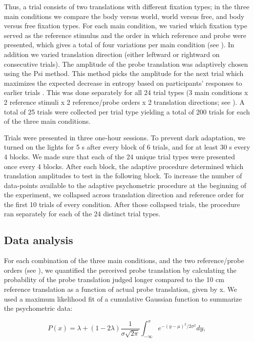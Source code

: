 Thus, a trial consists of two translations with different fixation types; in the three main conditions we compare the body versus world, world versus free, and body versus free fixation types. For each main condition, we varied which fixation type served as the reference stimulus and the order in which reference and probe were presented, which gives a total of four variations per main condition (see ). In addition we varied translation direction (either leftward or rightward on consecutive trials). The amplitude of the probe translation was adaptively chosen using the Psi method. This method picks the amplitude for the next trial which maximizes the expected decrease in entropy based on participants' responses to earlier trials \cite{kontsevich1999}. This was done separately for all 24 trial types (3 main conditions x 2 reference stimuli x 2 reference/probe orders x 2 translation directions; see ). A total of 25 trials were collected per trial type yielding a total of 200 trials for each of the three main conditions.

Trials were presented in three one-hour sessions. To prevent dark adaptation, we turned on the lights for 5 \si{\second} after every block of 6 trials, and for at least 30 \si{\second} every 4 blocks. We made sure that each of the 24 unique trial types were presented once every 4 blocks. After each block, the adaptive procedure determined which translation amplitudes to test in the following block. To increase the number of data-points available to the adaptive psychometric procedure at the beginning of the experiment, we collapsed across translation direction and reference order for the first 10 trials of every condition. After those collapsed trials, the procedure ran separately for each of the 24 distinct trial types.

\subsection{Data analysis}

For each combination of the three main conditions, and  the two reference/probe orders (see ), we quantified the perceived probe translation  by calculating the probability of the probe translation judged longer compared to the 10 \si{\centi\metre} reference translation as a function of actual probe translation, given by x. We used a maximum likelihood fit of a cumulative Gaussian function to summarize the psychometric data:

\begin{equation}
\label{p3:eq1}
P(x) = \lambda + (1 - 2\lambda) \frac{1}{\sigma \sqrt{2\pi}} \int_{-\infty}^{x}{e^{-(y-\mu)^2 / 2\sigma^2}}dy,
\end{equation}

